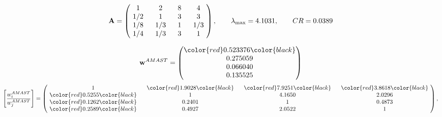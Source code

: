 \begin{example}
\begin{equation*}
\mathbf{A} =
\begin{pmatrix}
$\,\,$ 1 $\,\,$ & $\,\,$2$\,\,$ & $\,\,$8$\,\,$ & $\,\,$4 $\,\,$ \\
$\,\,$ 1/2$\,\,$ & $\,\,$ 1 $\,\,$ & $\,\,$3$\,\,$ & $\,\,$3 $\,\,$ \\
$\,\,$ 1/8$\,\,$ & $\,\,$ 1/3$\,\,$ & $\,\,$ 1 $\,\,$ & $\,\,$ 1/3 $\,\,$ \\
$\,\,$ 1/4$\,\,$ & $\,\,$ 1/3$\,\,$ & $\,\,$3$\,\,$ & $\,\,$ 1  $\,\,$ \\
\end{pmatrix},
\qquad
\lambda_{\max} =
4.1031,
\qquad
CR = 0.0389
\end{equation*}

\begin{equation*}
\mathbf{w}^{AMAST} =
\begin{pmatrix}
\color{red} 0.523376\color{black} \\
0.275059\\
0.066040\\
0.135525
\end{pmatrix}\end{equation*}
\begin{equation*}
\left[ \frac{{w}^{AMAST}_i}{{w}^{AMAST}_j} \right] =
\begin{pmatrix}
$\,\,$ 1 $\,\,$ & $\,\,$\color{red} 1.9028\color{black} $\,\,$ & $\,\,$\color{red} 7.9251\color{black} $\,\,$ & $\,\,$\color{red} 3.8618\color{black} $\,\,$ \\
$\,\,$\color{red} 0.5255\color{black} $\,\,$ & $\,\,$ 1 $\,\,$ & $\,\,$4.1650$\,\,$ & $\,\,$2.0296  $\,\,$ \\
$\,\,$\color{red} 0.1262\color{black} $\,\,$ & $\,\,$0.2401$\,\,$ & $\,\,$ 1 $\,\,$ & $\,\,$0.4873 $\,\,$ \\
$\,\,$\color{red} 0.2589\color{black} $\,\,$ & $\,\,$0.4927$\,\,$ & $\,\,$2.0522$\,\,$ & $\,\,$ 1  $\,\,$ \\
\end{pmatrix},
\end{equation*}


\end{example}
